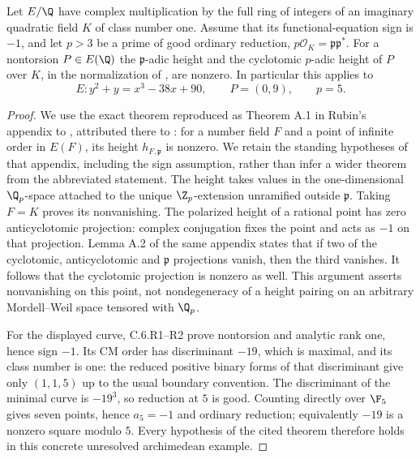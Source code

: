 \begin{statement}
Let $E/\Q$ have complex multiplication by the full ring of integers
of an imaginary quadratic field $K$ of class number one. Assume
that its functional-equation sign is $-1$, and let $p>3$ be a
prime of good ordinary reduction, $p\mathcal O_K=\mathfrak p
\mathfrak p^*$. For a nontorsion $P\in E(\Q)$ the
$\mathfrak p$-adic height and the cyclotomic $p$-adic height
of $P$ over $K$, in the normalization of
\citet[Appendix A]{agboola2006}, are nonzero.
In particular this applies to
\[
 E:y^2+y=x^3-38x+90,\qquad P=(0,9),\qquad p=5.
\]
\end{statement}
\begin{proof}
We use the exact theorem reproduced as Theorem A.1 in Rubin's
appendix to \citet{agboola2006}, attributed there to
\citet{bertrand1984}: for a number field $F$ and a point of
infinite order in $E(F)$, its height $h_{F,\mathfrak p}$ is
nonzero. We retain the standing hypotheses of that appendix,
including the sign assumption, rather than infer a wider theorem
from the abbreviated statement. The height takes values in
the one-dimensional $\Q_p$-space attached to the unique
$\Z_p$-extension unramified outside $\mathfrak p$.
Taking $F=K$ proves its nonvanishing. The polarized height of
a rational point has zero anticyclotomic projection: complex
conjugation fixes the point and acts as $-1$ on that projection.
Lemma A.2 of the same appendix states that if two of the
cyclotomic, anticyclotomic and $\mathfrak p$ projections
vanish, then the third vanishes. It follows that the cyclotomic
projection is nonzero as well. This argument asserts nonvanishing
on this point, not nondegeneracy of a height pairing on an
arbitrary Mordell--Weil space tensored with $\Q_p$.

For the displayed curve, C.6.R1--R2 prove nontorsion and
analytic rank one, hence sign $-1$. Its CM order has
discriminant $-19$, which is maximal, and its class number is
one: the reduced positive binary forms of that discriminant
give only $(1,1,5)$ up to the usual boundary convention.
The discriminant of the minimal curve is $-19^3$, so reduction
at $5$ is good. Counting directly over $\F_5$ gives seven
points, hence $a_5=-1$ and ordinary reduction; equivalently
$-19$ is a nonzero square modulo $5$. Every hypothesis of the
cited theorem therefore holds in this concrete unresolved
archimedean example.
\end{proof}
